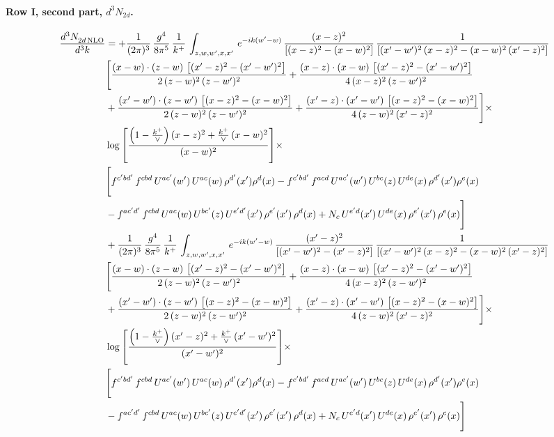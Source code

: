 \documentclass[10pt]{article}
\numberwithin{equation}{section}
\begin{document}
\paragraph{Row I, second part, $d^3N_{2d}$.}
\begin{align}
 \frac{d^{3}N_{2d\,\rm NLO}^{\rm}}{d^{3}k}  & =   +\frac{1}{(2\pi)^{3}}\, \frac{g^{4}}{8\pi^{5}}\,\frac{1}{k^{+}}\,\int_{z,w,w^{\prime},x,x'}\, e^{-ik(w^{\prime}-w)}\,\frac{(x-z)^{2}}{\left[(x-z)^{2}-(x-w)^{2}\right]}\,\frac{1}{\left[(x'-w')^{2}\,(x-z)^{2} - (x-w)^{2}\,(x'-z)^{2}\right]}\notag \\ & \Bigg[\frac{(x-w)\cdot (z-w)\, \left[(x'-z)^{2}-(x'-w')^{2}\right]}{2\, (z-w)^{2}\, (z-w')^{2}}  + \frac{(x-z)\cdot (x-w)\,\left[(x'-z)^{2}-(x'-w')^{2}\right] }{4\,(x-z)^{2}\,(z-w')^{2}}\notag \\ & +\frac{(x'-w')\cdot (z-w')\, \left[(x-z)^{2}-(x-w)^{2}\right]}{2\, (z-w)^{2}\, (z-w')^{2}}+ \frac{(x'-z)\cdot (x'-w')\, \left[(x-z)^{2}-(x-w)^{2}\right]}{4\, (z-w)^{2}\,(x'-z)^{2}}\Bigg]\times\,\notag \\ & \log{\left[\frac{\left(1-\frac{k^{+}}{\vee}\right)(x-z)^{2}+\frac{k^{+}}{\vee}\,(x-w)^{2}}{(x-w)^{2}}\right]} \times\notag \\ & \Bigg[f^{c'bd'}\,f^{cbd}\, U^{ac'}(w')\,U^{ac}(w)\,\rho^{d'}(x')\rho^{d}(x)- f^{c'bd'}\,f^{acd}\,U^{ac'}(w')\,U^{bc}(z)\,U^{de}(x)\,\rho^{d'}(x')\rho^{e}(x) \notag \\ & -f^{ac'd'}\,f^{cbd}\,U^{ac}(w)\,U^{bc'}(z)\,U^{e'd'}(x')\,\rho^{e'}(x')\,\rho^{d}(x) +N_{c}\,U^{e'd}(x')\,U^{de}(x)\,\rho^{e'}(x')\,\rho^{e}(x)\Bigg] \notag \\
& +\frac{1}{(2\pi)^{3}}\, \frac{g^{4}}{8\pi^{5}}\,\frac{1}{k^{+}}\,\int_{z,w,w^{\prime},x,x'}\, e^{-ik(w^{\prime}-w)}\,\frac{(x'-z)^{2}}{\left[(x'-w')^{2}-(x'-z)^{2}\right]}\,\frac{1}{\left[(x'-w')^{2}\,(x-z)^{2} - (x-w)^{2}\,(x'-z)^{2}\right]}\notag \\ & \Bigg[\frac{(x-w)\cdot (z-w)\, \left[(x'-z)^{2}-(x'-w')^{2}\right]}{2\, (z-w)^{2}\, (z-w')^{2}}  + \frac{(x-z)\cdot (x-w)\,\left[(x'-z)^{2}-(x'-w')^{2}\right] }{4\,(x-z)^{2}\,(z-w')^{2}}\notag \\ & +\frac{(x'-w')\cdot (z-w')\, \left[(x-z)^{2}-(x-w)^{2}\right]}{2\, (z-w)^{2}\, (z-w')^{2}}+ \frac{(x'-z)\cdot (x'-w')\, \left[(x-z)^{2}-(x-w)^{2}\right]}{4\, (z-w)^{2}\,(x'-z)^{2}}\Bigg]\times\,\notag \\ & \log{\left[\frac{\left(1-\frac{k^{+}}{\vee}\right)(x'-z)^{2}+\frac{k^{+}}{\vee}\,(x'-w')^{2}}{(x'-w')^{2}}\right]} \times\notag \\ & \Bigg[f^{c'bd'}\,f^{cbd}\, U^{ac'}(w')\,U^{ac}(w)\,\rho^{d'}(x')\rho^{d}(x)- f^{c'bd'}\,f^{acd}\,U^{ac'}(w')\,U^{bc}(z)\,U^{de}(x)\,\rho^{d'}(x')\rho^{e}(x) \notag \\ & -f^{ac'd'}\,f^{cbd}\,U^{ac}(w)\,U^{bc'}(z)\,U^{e'd'}(x')\,\rho^{e'}(x')\,\rho^{d}(x) +N_{c}\,U^{e'd}(x')\,U^{de}(x)\,\rho^{e'}(x')\,\rho^{e}(x)\Bigg] \label{eq:F:G2I2d}
\end{align}
\end{document}
